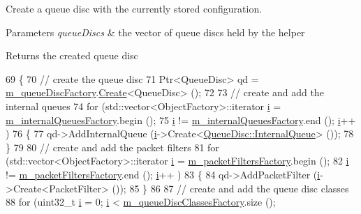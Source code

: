 Create a queue disc with the currently stored configuration. 


\begin{DoxyParams}{Parameters}
{\em queue\+Discs} & the vector of queue discs held by the helper \\
\hline
\end{DoxyParams}
\begin{DoxyReturn}{Returns}
the created queue disc 
\end{DoxyReturn}

\begin{DoxyCode}
69 \{
70   \textcolor{comment}{// create the queue disc}
71   Ptr<QueueDisc> qd = \hyperlink{classns3_1_1QueueDiscFactory_acc62f610bfd64e570a89891a1941a197}{m\_queueDiscFactory}.\hyperlink{classns3_1_1ObjectFactory_a18152e93f0a6fe184ed7300cb31e9896}{Create}<QueueDisc> ();
72 
73   \textcolor{comment}{// create and add the internal queues}
74   \textcolor{keywordflow}{for} (std::vector<ObjectFactory>::iterator \hyperlink{bernuolliDistribution_8m_a6f6ccfcf58b31cb6412107d9d5281426}{i} = \hyperlink{classns3_1_1QueueDiscFactory_a1662d1d7c56f001ee2cec98eeffd641e}{m\_internalQueuesFactory}.begin ();
75        \hyperlink{bernuolliDistribution_8m_a6f6ccfcf58b31cb6412107d9d5281426}{i} != \hyperlink{classns3_1_1QueueDiscFactory_a1662d1d7c56f001ee2cec98eeffd641e}{m\_internalQueuesFactory}.end (); \hyperlink{bernuolliDistribution_8m_a6f6ccfcf58b31cb6412107d9d5281426}{i}++ )
76     \{
77       qd->AddInternalQueue (\hyperlink{bernuolliDistribution_8m_a6f6ccfcf58b31cb6412107d9d5281426}{i}->Create<\hyperlink{classns3_1_1QueueDisc_a3acb7d460465f9f13c6fbbdeae7508f8}{QueueDisc::InternalQueue}> ());
78     \}
79 
80   \textcolor{comment}{// create and add the packet filters}
81   \textcolor{keywordflow}{for} (std::vector<ObjectFactory>::iterator \hyperlink{bernuolliDistribution_8m_a6f6ccfcf58b31cb6412107d9d5281426}{i} = \hyperlink{classns3_1_1QueueDiscFactory_aba9caa76a10faa6bb43d8e8a43125dcb}{m\_packetFiltersFactory}.begin ();
82        \hyperlink{bernuolliDistribution_8m_a6f6ccfcf58b31cb6412107d9d5281426}{i} != \hyperlink{classns3_1_1QueueDiscFactory_aba9caa76a10faa6bb43d8e8a43125dcb}{m\_packetFiltersFactory}.end (); \hyperlink{bernuolliDistribution_8m_a6f6ccfcf58b31cb6412107d9d5281426}{i}++ )
83     \{
84       qd->AddPacketFilter (\hyperlink{bernuolliDistribution_8m_a6f6ccfcf58b31cb6412107d9d5281426}{i}->Create<PacketFilter> ());
85     \}
86 
87   \textcolor{comment}{// create and add the queue disc classes}
88   \textcolor{keywordflow}{for} (uint32\_t \hyperlink{bernuolliDistribution_8m_a6f6ccfcf58b31cb6412107d9d5281426}{i} = 0; \hyperlink{bernuolliDistribution_8m_a6f6ccfcf58b31cb6412107d9d5281426}{i} < \hyperlink{classns3_1_1QueueDiscFactory_ad173551ed51d3398656bc755a7e28290}{m\_queueDiscClassesFactory}.size (); 

\end{DoxyCode}
